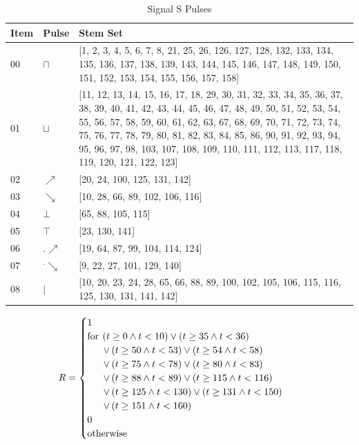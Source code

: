 \documentclass[10pt,journal]{IEEEtran}
\begin{document}
\begin{table}[H] \caption{Signal S Pulses}\centering\begin{tabular}{|p{.4cm}|p{.5cm}|p{6.5cm}|}\hline Item&Pulse &Stem Set\\ \hline 00& \footnotesize$\sqcap$ & \footnotesize[1, 2, 3, 4, 5, 6, 7, 8, 21, 25, 26, 126, 127, 128, 132, 133, 134, 135, 136, 137, 138, 139, 143, 144, 145, 146, 147, 148, 149, 150, 151, 152, 153, 154, 155, 156, 157, 158]\\ \hline 01& \footnotesize$\sqcup$ & \footnotesize[11, 12, 13, 14, 15, 16, 17, 18, 29, 30, 31, 32, 33, 34, 35, 36, 37, 38, 39, 40, 41, 42, 43, 44, 45, 46, 47, 48, 49, 50, 51, 52, 53, 54, 55, 56, 57, 58, 59, 60, 61, 62, 63, 67, 68, 69, 70, 71, 72, 73, 74, 75, 76, 77, 78, 79, 80, 81, 82, 83, 84, 85, 86, 90, 91, 92, 93, 94, 95, 96, 97, 98, 103, 107, 108, 109, 110, 111, 112, 113, 117, 118, 119, 120, 121, 122, 123]\\ \hline 02& \footnotesize$\nearrow$ & \footnotesize[20, 24, 100, 125, 131, 142]\\ \hline 03& \footnotesize$\searrow$ & \footnotesize[10, 28, 66, 89, 102, 106, 116]\\ \hline 04& \footnotesize$\bot$ & \footnotesize[65, 88, 105, 115]\\ \hline 05& \footnotesize$\top$ & \footnotesize[23, 130, 141]\\ \hline 06& \footnotesize$.\nearrow$ & \footnotesize[19, 64, 87, 99, 104, 114, 124]\\ \hline 07& \footnotesize$^.\searrow$ & \footnotesize[9, 22, 27, 101, 129, 140]\\ \hline 08& \footnotesize$|$ & \footnotesize[10, 20, 23, 24, 28, 65, 66, 88, 89, 100, 102, 105, 106, 115, 116, 125, 130, 131, 141, 142]\\ \hline \end{tabular} \end{table} 
\begin{equation}
 \begin{minipage}{250pt}
\begin{flushleft} $\displaystyle R = \begin{cases} 1 & \\  \text{for}\: \left(t \geq 0 \wedge t < 10\right) \vee \left(t \geq 35 \wedge t <36 \right) \\ \quad \ \  \vee \left(t \geq 50 \wedge t < 53\right) \vee \left(t \geq 54 \wedge t <58 \right) \\ \quad \ \  \vee \left(t \geq 75 \wedge t < 78\right) \vee \left(t \geq 80 \wedge t <83\right) \\ \quad \ \  \vee \left(t \geq 88 \wedge t < 89\right) \vee \left(t \geq 115 \wedge t < 116\right) \\ \quad \ \  \vee \left(t \geq 125 \wedge t < 130\right) \vee \left(t \geq 131 \wedge t < 150\right) \\ \quad \ \  \vee \left(t \geq 151 \wedge t < 160\right) \\0 & \\  \text{otherwise} \end{cases}$  \end{flushleft}
 \end{minipage}
 \end{equation}
\end{document}
